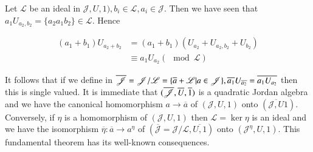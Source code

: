 Let $\mathscr{L}$ be an ideal in $\mathscr{J},U,1), b_i\in \mathscr{L}, a_i\in \mathscr{J}$. Then we have seen that $a_1U_{a_{2},b_{2}}=\{a_2a_1b_2\}\in \mathscr{L}$. Hence

\begin{align*}
(a_1+b_1)U_{a_{2}+b_{2}}&=(a_1+b_1)(U_{a_{2}}+U_{a_{2},b_{2}}+U_{b_{2}})\\
&\equiv a_1U_{a_{2}}(\mod \mathscr{L})
\end{align*}

It follows that if we define in
$\overline{\mathscr{J}}=\mathscr{J}/\mathscr{L}=\{\overline{a}+\mathscr{L}|a\in\mathscr{J}\},
\overline{a_1}\break U_{\overline{a_{2}}}=\overline{a_1U_{a_{2}}}$    
then this is single valued. It is immediate that
$(\overline{\mathscr{J}}, \overline{U}, \overline{1})$ is a quadratic Jordan algebra and we
have the canonical homomorphism $a\to \overline{a}$ of
$(\mathscr{J},U,1)$ onto $(\overline{\mathscr{J},U}1)$. Conversely, if
$\eta$ is a homomorphism of $(\mathscr{J},U,1)$ then
$\mathscr{L}=\ker \eta$ is an ideal and we have the isomorphism
$\overline{\eta}:\overline{a}\to a^{\eta}$ of
$(\overline{\mathscr{J}}=\mathscr{J}/\mathscr{L}, \overline{U, 1})$
onto $(\mathscr{J}^{\eta},U,1)$. This fundamental theorem has its
well-known consequences.
 
